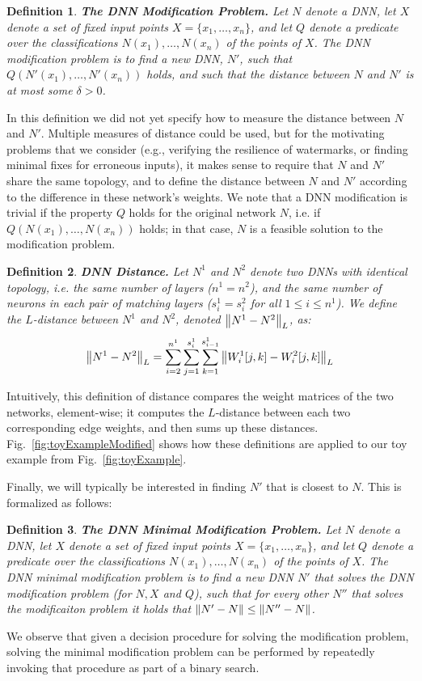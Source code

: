 \documentclass{easychair}
\newtheorem{definition}{Definition}
\newcommand{\guy}[1]{\marginpar{\textcolor{orange}{Guy: #1}}}
\begin{document}
\begin{definition}\textbf{The DNN Modification Problem.}
  Let $N$ denote a DNN, let $X$ denote a set of fixed input points
  $X=\{x_1, \ldots, x_n\}$, and let $Q$ denote a predicate over the
  classifications $N(x_1),\ldots,N(x_n)$ of the points of $X$. The
  \emph{DNN modification problem} is to find a new DNN, $N'$, such that
  $Q(N'(x_1),\ldots,N'(x_n))$ holds, and such that the distance
  between $N$ and $N'$ is at most some $\delta>0$.
\end{definition}

In this definition we did not yet specify how to measure the distance
between $N$ and $N'$. Multiple measures of distance could be used, but for the
motivating problems that we consider (e.g., verifying the resilience
of watermarks, or finding minimal fixes for erroneous inputs), it
makes sense to require that $N$ and $N'$ share the same topology, and
to define the distance between $N$ and $N'$ according to the
difference in these network's weights. We note that a DNN modification
is trivial if the property $Q$ holds for the original network $N$,
i.e. if $Q(N(x_1),\ldots,N(x_n))$ holds; in that case, $N$ is a
feasible solution to the modification problem.

\begin{definition}\textbf{DNN Distance.}
  Let $N^1$ and $N^2$ denote two DNNs with identical topology,
  i.e. the same number of layers ($n^1=n^2$), and the same number of
  neurons in each pair of matching layers ($s_i^1=s_i^2$ for all
  $1\leq i \leq n^1$). We define the $L$-distance between $N^1$ and $N^2$,
  denoted $\left\lVert N^1-N^2\right\rVert_L$, as:
  \[
    \left\lVert N^1-N^2\right\rVert_L =    \sum_{i=2}^{n^1}\sum_{j=1}^{s_{i}^1}\sum_{k=1}^{s_{i-1}^1}
    \left\lVert W^1_i[j,k] - W^2_i[j,k]\right\rVert_L
  \]
\end{definition}
Intuitively, this definition of distance compares the weight matrices
of the two networks, element-wise; it computes the $L$-distance
between each two corresponding edge weights, and then sums up these
distances. 
Fig.~\ref{fig:toyExampleModified} shows how these definitions are applied
to our toy example from Fig.~\ref{fig:toyExample}.
\guy{TODO: Ben, please continue with the same example from the
  previous section}

Finally, we will typically be interested in finding $N'$ that is
closest to $N$. This is formalized as follows:
\begin{definition}\textbf{The DNN Minimal Modification Problem.}
  Let $N$ denote a DNN, let $X$ denote a set of fixed input points
  $X=\{x_1, \ldots, x_n\}$, and let $Q$ denote a predicate over the
  classifications $N(x_1),\ldots,N(x_n)$ of the points of $X$. The
  \emph{DNN minimal modification problem} is to find a new DNN $N'$
  that solves the DNN modification problem (for $N, X$ and $Q$), such that for every other
  $N''$ that solves the modificaiton problem it holds that
  $\left\lVert N'-N\right\rVert\leq \left\lVert N''-N\right\rVert$.
\end{definition}
We observe that given a decision procedure for solving the modification
problem, solving the minimal modification problem can be performed by
repeatedly invoking that procedure as part of a binary search.
\end{document}
